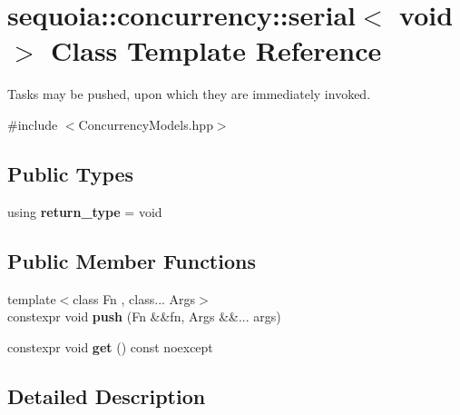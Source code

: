 \hypertarget{classsequoia_1_1concurrency_1_1serial_3_01void_01_4}{}\section{sequoia\+::concurrency\+::serial$<$ void $>$ Class Template Reference}
\label{classsequoia_1_1concurrency_1_1serial_3_01void_01_4}


Tasks may be pushed, upon which they are immediately invoked.  




{\ttfamily \#include $<$Concurrency\+Models.\+hpp$>$}

\subsection*{Public Types}
\begin{DoxyCompactItemize}
\item 
\mbox{\label{classsequoia_1_1concurrency_1_1serial_3_01void_01_4_a94ddda5262faaa8dc20b0782c912a4b3}} 
using {\bfseries return\+\_\+type} = void
\end{DoxyCompactItemize}
\subsection*{Public Member Functions}
\begin{DoxyCompactItemize}
\item 
\mbox{\label{classsequoia_1_1concurrency_1_1serial_3_01void_01_4_ad4c37bed1d8c69c8090575111f7ca7a0}} 
{\footnotesize template$<$class Fn , class... Args$>$ }\\constexpr void {\bfseries push} (Fn \&\&fn, Args \&\&... args)
\item 
\mbox{\label{classsequoia_1_1concurrency_1_1serial_3_01void_01_4_ab52f653e7803f0d49d1e61b9ae5f9504}} 
constexpr void {\bfseries get} () const noexcept
\end{DoxyCompactItemize}


\subsection{Detailed Description}
